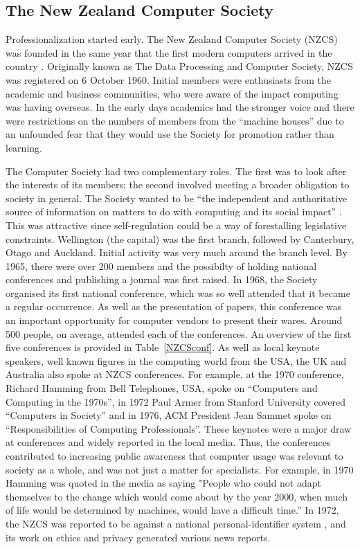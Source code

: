 \documentclass{IEEEcsmag}
\begin{document}
\subsection{The New Zealand Computer Society}
\vspace*{5pt}
Professionalization started early. The New Zealand Computer Society (NZCS) was founded in the same year that the first modern computers arrived in the country \cite{Moon2010}.
Originally known as The Data Processing and Computer Society, NZCS was registered on 6 October 1960. Initial members were enthusiasts from the academic and business communities, who were aware of the impact computing was having overseas. In the early days academics had the stronger voice and there were restrictions on the numbers of members from the “machine houses” due to an unfounded fear that they would use the Society for promotion rather than learning.

The Computer Society had two complementary roles. The first was to look after the interests of its members; the second involved meeting a broader obligation to society in general. The Society wanted to be “the independent and authoritative source of information on matters to do with computing and its social impact” . This was attractive since self-regulation could be a way of forestalling legislative constraints.
Wellington (the capital) was the first branch, followed by Canterbury, Otago and Auckland. Initial activity was very much around the branch level. By 1965, there were over 200 members and the possibilty of holding national conferences and publishing a journal was first raised. 
In 1968, the Society organised its first national conference, which was so well attended that it became a regular occurrence. As well as the presentation of papers, this conference was an important opportunity for computer vendors to present their wares. Around 500 people, on average, attended each of the conferences. An overview of the first five conferences is provided in Table~\ref{NZCSconf}. As well as local keynote speakers, well known figures in the computing world from the USA, the UK and Australia also spoke at NZCS conferences. For example, at the 1970 conference, Richard Hamming from Bell Telephones, USA, spoke on “Computers and Computing in the 1970s”, in 1972 Paul Armer from Stanford University covered “Computers in Society” and in 1976, ACM President Jean Sammet spoke on “Responsibilities of Computing Professionals”. These keynotes were a major draw at conferences and widely reported in the local media.
\cbstart
Thus, the conferences contributed to increasing public awareness that computer usage was relevant to society as a whole, and was not just  a matter for specialists. For example, in 1970 Hamming was quoted in the media as saying "People who could not adapt themselves to the change which would come about by the year 2000, when much of life would be determined by machines, would have a difficult time.” \cite{Press-Hamming} In 1972, the NZCS was reported to be against a national personal-identifier system \cite{Press-Nat-ID}, and its work on ethics and privacy generated various news reports.
\cbend
\end{document}
